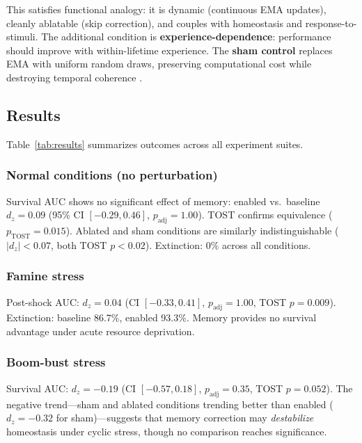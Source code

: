 \documentclass[letterpaper]{article}
\begin{document}
This satisfies functional analogy: it is dynamic (continuous EMA
updates), cleanly ablatable (skip correction), and couples with
homeostasis and response-to-stimuli.  The additional condition is
\textbf{experience-dependence}: performance should improve with
within-lifetime experience.  The \textbf{sham control} replaces EMA
with uniform random draws, preserving computational cost while
destroying temporal coherence \citep{soltoggio_2018_born}.

\subsection{Results}

Table~\ref{tab:results} summarizes outcomes across all experiment suites.

\subsubsection*{Normal conditions (no perturbation)}
Survival AUC shows no significant effect of memory: enabled vs.\
baseline $d_z = 0.09$ (95\% CI $[-0.29, 0.46]$, $p_\mathrm{adj} =
1.00$).  TOST confirms equivalence ($p_\mathrm{TOST} = 0.015$).
Ablated and sham conditions are similarly indistinguishable
($|d_z| < 0.07$, both TOST $p < 0.02$).  Extinction: 0\% across all
conditions.

\subsubsection*{Famine stress}
Post-shock AUC: $d_z = 0.04$ (CI $[-0.33, 0.41]$, $p_\mathrm{adj} =
1.00$, TOST $p = 0.009$).  Extinction: baseline 86.7\%, enabled 93.3\%.
Memory provides no survival advantage under acute resource deprivation.

\subsubsection*{Boom-bust stress}
Survival AUC: $d_z = -0.19$ (CI $[-0.57, 0.18]$, $p_\mathrm{adj} =
0.35$, TOST $p = 0.052$).  The negative trend---sham and ablated
conditions trending better than enabled ($d_z = -0.32$ for sham)---suggests
that memory correction may \emph{destabilize} homeostasis under cyclic
stress, though no comparison reaches significance.
\end{document}
